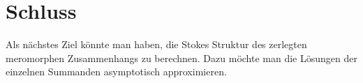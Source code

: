 \chapter{Schluss}
\begin{comment}
Es wurde gezeigt...
\end{comment}

\begin{comment}
Stokes Struktur ausrechen? Dazu die Lösung asymptotisch approximieren
$\rightsquigarrow$ offensichtlich schwer\\
deshalb suche andere Lösung
\end{comment}
Als nächstes Ziel könnte man haben, die Stokes Struktur des zerlegten
meromorphen Zusammenhangs zu berechnen.
Dazu möchte man die Lösungen der einzelnen Summanden asymptotisch
approximieren. 


